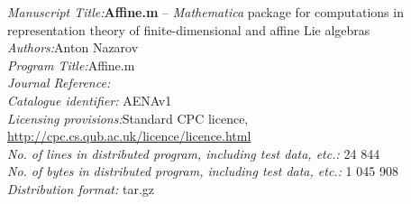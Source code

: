 \documentclass[preprint,12pt]{elsarticle}
\newcounter{bla}
\begin{document}
\begin{small}
\noindent
{\em Manuscript Title:}{\bf Affine.m} -- {\it Mathematica} package for computations in representation theory of finite-dimensional and affine Lie algebras                                       \\
{\em Authors:}Anton Nazarov                                                \\
{\em Program Title:}Affine.m                                          \\
{\em Journal Reference:}                                      \\
{\em Catalogue identifier:}  AENA\textunderscore v1                                 \\
{\em Licensing provisions:}Standard CPC licence, \url{http://cpc.cs.qub.ac.uk/licence/licence.html}                                   \\

{\em No. of lines in distributed program, including test data, etc.:} 24 844\\
{\em No. of bytes in distributed program, including test data, etc.:} 1 045 908\\
{\em Distribution format:} tar.gz\\


\end{small}
\end{document}
